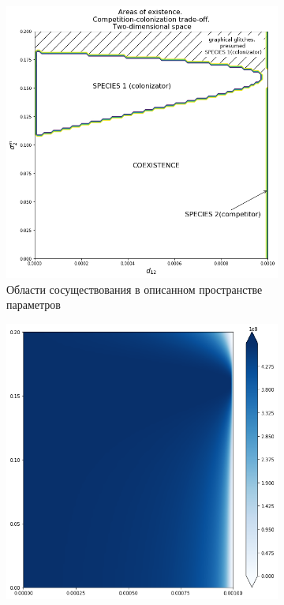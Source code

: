 \begin{figure}
\begin{subfigure}{.5\textwidth}
		\includegraphics[width=.95\linewidth]{arccto08d2.png}
		\caption{Области сосуществования в описанном пространстве параметров}
		\label{fig:cctod2:sub2}
	\end{subfigure}
	\centering
	\begin{subfigure}{.5\textwidth}
		\centering
		\includegraphics[width=.95\linewidth]{ccto_d2_n1.png}

\end{subfigure}
\end{figure}
